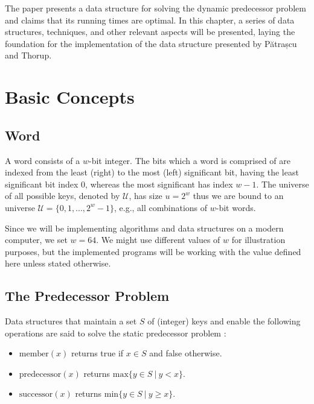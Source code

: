 The \cite{patrascu2014dynamic} paper presents a data structure for solving the dynamic predecessor problem and claims that its running times are optimal.
In this chapter, a series of data structures, techniques, and other relevant aspects will be presented, laying the foundation for the implementation of the data structure presented by Pătrașcu and Thorup.

\section{Basic Concepts}

\subsection{Word} \label{sec:word}
A word consists of a $w$-bit integer.
The bits which a word is comprised of are indexed from the least (right) to the most (left) significant bit, having the least significant bit index $0$, whereas the most significant has index $w-1$.
The universe of all possible keys, denoted by $\mathcal U$, has size $u = 2^{w}$ thus we are bound to an universe $\mathcal U = \{0, 1, ..., 2^{w}-1\}$, e.g., all combinations of $w$-bit words.

Since we will be implementing algorithms and data structures on a modern computer, we set $w = 64$. We might use different values of $w$ for illustration purposes, but the implemented programs will be working with the value defined here unless stated otherwise.

\subsection{The Predecessor Problem} \label{sec:predecessorProblem}
Data structures that maintain a set $S$ of (integer) keys and enable the following operations are said to solve the static predecessor problem \cite{beame1999optimal}:
\begin{itemize}
    \item
    $\text{member}(x)$ returns {\ttfamily true} if $x \in S$ and {\ttfamily false} otherwise.
    
    \item
    $\text{predecessor}(x)$ returns $\text{max}\{y\in S\ |\ y < x\}$.
    
    \item
    $\text{successor}(x)$ returns $\text{min}\{y\in S\ |\ y \geq x\}$.
\end{itemize}

